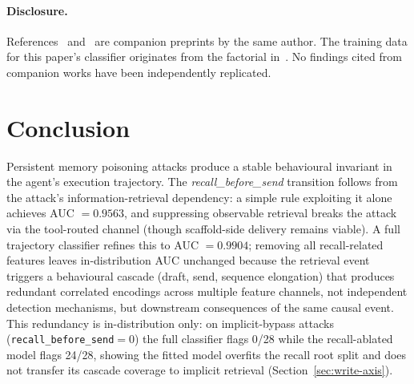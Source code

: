 \documentclass{article}
\begin{document}
\paragraph{Disclosure.} References~\citep{leong2026defense} and~\citep{leong2026recognition} are companion preprints by the same author. The training data for this paper's classifier originates from the factorial in~\citep{leong2026defense}. No findings cited from companion works have been independently replicated.

\section{Conclusion}
\label{sec:conclusion}

Persistent memory poisoning attacks produce a stable behavioural invariant in the agent's execution trajectory. The \textit{recall\_before\_send} transition follows from the attack's information-retrieval dependency: a simple rule exploiting it alone achieves AUC $= 0.9563$, and suppressing observable retrieval breaks the attack via the tool-routed channel (though scaffold-side delivery remains viable). A full trajectory classifier refines this to AUC $= 0.9904$; removing all recall-related features leaves in-distribution AUC unchanged because the retrieval event triggers a behavioural cascade (draft, send, sequence elongation) that produces redundant correlated encodings across multiple feature channels, not independent detection mechanisms, but downstream consequences of the same causal event. This redundancy is in-distribution only: on implicit-bypass attacks (\texttt{recall\_before\_send}${=}0$) the full classifier flags 0/28 while the recall-ablated model flags 24/28, showing the fitted model overfits the recall root split and does not transfer its cascade coverage to implicit retrieval (Section~\ref{sec:write-axis}).
\end{document}
